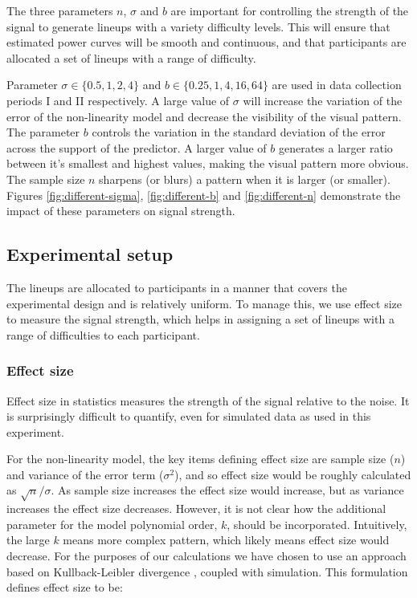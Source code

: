 \documentclass[]{interact}
\theoremstyle{plain}%
\theoremstyle{definition}
\theoremstyle{remark}
\begin{document}
The three parameters \(n\), \(\sigma\) and \(b\) are important for
controlling the strength of the signal to generate lineups with a
variety difficulty levels. This will ensure that estimated power curves
will be smooth and continuous, and that participants are allocated a set
of lineups with a range of difficulty.

Parameter \(\sigma \in \{0.5, 1, 2, 4\}\) and
\(b \in \{0.25, 1, 4, 16, 64\}\) are used in data collection periods I
and II respectively. A large value of \(\sigma\) will increase the
variation of the error of the non-linearity model and decrease the
visibility of the visual pattern. The parameter \(b\) controls the
variation in the standard deviation of the error across the support of
the predictor. A larger value of \(b\) generates a larger ratio between
it's smallest and highest values, making the visual pattern more
obvious. The sample size \(n\) sharpens (or blurs) a pattern when it is
larger (or smaller). Figures \ref{fig:different-sigma},
\ref{fig:different-b} and \ref{fig:different-n} demonstrate the impact
of these parameters on signal strength.

\hypertarget{experimental-setup}{%
\subsection{Experimental setup}\label{experimental-setup}}

The lineups are allocated to participants in a manner that covers the
experimental design and is relatively uniform. To manage this, we use
effect size to measure the signal strength, which helps in assigning a
set of lineups with a range of difficulties to each participant.

\hypertarget{effect-size}{%
\subsubsection{Effect size}\label{effect-size}}

Effect size in statistics measures the strength of the signal relative
to the noise. It is surprisingly difficult to quantify, even for
simulated data as used in this experiment.

For the non-linearity model, the key items defining effect size are
sample size (\(n\)) and variance of the error term (\(\sigma^2\)), and
so effect size would be roughly calculated as \(\sqrt{n}/{\sigma}\). As
sample size increases the effect size would increase, but as variance
increases the effect size decreases. However, it is not clear how the
additional parameter for the model polynomial order, \(k\), should be
incorporated. Intuitively, the large \(k\) means more complex pattern,
which likely means effect size would decrease. For the purposes of our
calculations we have chosen to use an approach based on Kullback-Leibler
divergence \citep{kullback1951information}, coupled with simulation.
This formulation defines effect size to be:
\end{document}
